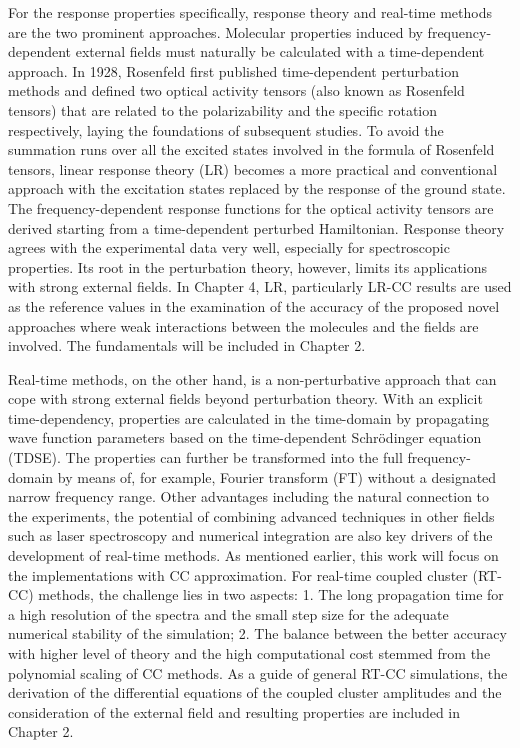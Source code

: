 For the response properties specifically, response theory and real-time methods
are the two prominent approaches. Molecular properties induced by
frequency-dependent external fields must naturally be calculated with a
time-dependent approach. In 1928, Rosenfeld first published time-dependent
perturbation methods and defined two optical activity tensors (also known as
Rosenfeld tensors) that are related to the polarizability and the specific
rotation respectively, laying the foundations of subsequent
studies.\cite{Rosenfeld1929} To avoid the summation runs over all the excited
states involved in the formula of Rosenfeld tensors, linear response theory
(LR)\cite{Olsen1985, Sekino1984} becomes a more practical and conventional
approach with the excitation states replaced by the response of the ground
state. The frequency-dependent response functions for the optical activity
tensors are derived starting from a time-dependent perturbed Hamiltonian.
Response theory agrees with the experimental data very well, especially for
spectroscopic properties.\cite{Kobayashi1994, Roos1996, Coriani2012} Its root
in the perturbation theory, however, limits its applications with strong
external fields. In Chapter 4, LR, particularly LR-CC results are used as the
reference values in the examination of the accuracy of the proposed novel
approaches where weak interactions between the molecules and the fields are
involved. The fundamentals will be included in Chapter 2. 

Real-time methods, on the other hand, is a non-perturbative approach that can
cope with strong external fields beyond perturbation theory.\cite{Goings2018,
Li2020} With an explicit time-dependency, properties are calculated in the
time-domain by propagating wave function parameters based on the time-dependent
Schr\"odinger equation (TDSE). The properties can further be transformed into
the full frequency-domain by means of, for example, Fourier transform (FT)
without a designated narrow frequency range. Other advantages including the
natural connection to the experiments, the potential of combining advanced
techniques in other fields such as laser spectroscopy and numerical integration
are also key drivers of the development of real-time methods. As mentioned
earlier, this work will focus on the implementations with CC approximation. For
real-time coupled cluster (RT-CC) methods, the challenge lies in two aspects:
1. The long propagation time for a high resolution of the spectra and the small
step size for the adequate numerical stability of the simulation; 2. The
balance between the better accuracy with higher level of theory and the high
computational cost stemmed from the polynomial scaling of CC methods. As a
guide of general RT-CC simulations, the derivation of the differential
equations of the coupled cluster amplitudes and the consideration of the
external field and resulting properties are included in Chapter 2. 

